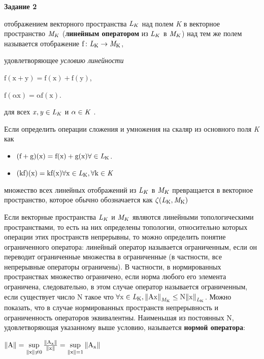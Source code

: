 \documentclass{article}
\begin{document}
{\bf Задание 2}

{ отображением} векторного пространства $\mathrm{\it L}_K$ над полем {\Large \it K} в
векторное пространство $\mathrm{\it M}_K$ ({\bf линейным оператором} из $\mathrm{\it L}_K$ в $\mathrm{\it M}_K$) над тем
же полем называется отображение $\mathrm{f\colon {\it L}_K \to {\it M}_K}$,

удовлетворяющее {\it условию линейности}

$\mathrm{f(x+y)=f(x)+f(y)}$,

$\mathrm{f(\alpha x)=\alpha f(x)}$.

для всех $\mathrm{\it x,y \in {\it L}_K }$ и $\mathrm{\alpha \in {\Large \it K}}$ .

Если определить операции сложения и умножения на скаляр из основного поля {\Large \it K} как
\begin{itemize}
\item $\mathrm{(f+g)(x)=f(x)+g(x) \forall \in {\it L}_K}$.
\item $\mathrm{(kf)(x)=kf(x) \forall x \in {\it L}_K , \forall k \in {\Large \it K}}$
\end{itemize}

множество всех линейных отображений из $\mathrm{\it L}_K$ в $\mathrm{\it M}_K$ превращается в
векторное пространство, которое обычно обозначается как $\mathrm{\zeta({\it L}_K, {\it M}_K)}$


Если векторные пространства $\mathrm{\it L}_K$ и $\mathrm{\it M}_K$ являются линейными
топологическими пространствами, то есть на них определены топологии,
относительно которых операции этих пространств непрерывны, то можно
определить понятие ограниченного оператора: линейный оператор
называется ограниченным, если он переводит ограниченные множества в
ограниченные (в частности, все непрерывные операторы ограничены). В
частности, в нормированных пространствах множество ограничено, если
норма любого его элемента ограничена, следовательно, в этом случае
оператор называется ограниченным, если существует число N такое что $\mathrm{\forall x \in {\it L}_K,  {\|{\Large A} x \|}_{{\it M}_K} \le {{\Large N} \| x \|}_{{\it L}_K }}$. Можно показать, что в случае
нормированных пространств непрерывность и ограниченность операторов
эквивалентны. Наименьшая из постоянных N, удовлетворяющая указанному
выше условию, называется {\bf нормой оператора}:

$\mathrm{ \| {\Large A} \| = \sup\limits_{\|x\| \neq 0} \frac{\|{\Large A}_x\|}{\|x\|} = \sup\limits_{\|x\|=1} \|{\Large A}_x\|}$
\end{document}
